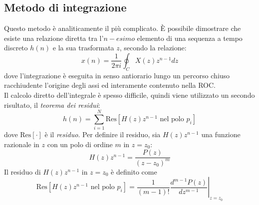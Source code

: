 \subsection{Metodo di integrazione}
Questo metodo \`e analiticamente il pi\`u complicato. \`E possibile dimostrare che esiste una relazione diretta tra l'$n-esimo$ elemento di una sequenza a tempo discreto ${h(n)}$ e la sua trasformata $z$, secondo la relazione:
\begin{displaymath}
x(n)=\frac{1}{2\pi i}\oint_C X(z)z^{n-1}dz
\end{displaymath}
dove l'integrazione \`e eseguita in senso antiorario lungo un percorso chiuso racchiudente l'origine degli assi ed interamente contenuto nella ROC.\\
Il calcolo diretto dell'integrale \`e spesso difficile, quindi viene utilizzato un secondo risultato, il \emph{teorema dei residui}:
\begin{displaymath}
h(n)=\sum_{i=1}^{N} \textrm{Res}[H(z)z^{n-1} \textrm{ nel polo }p_i]
\end{displaymath}
dove $\textrm{Res}[\cdot]$ \`e il \emph{residuo}.
Per definire il residuo, sia $H(z)z^{n-1}$ una funzione razionale in $z$ con un polo di ordine $m$ in $z=z_0$:
\begin{displaymath}
H(z)z^{n-1}=\frac{P(z)}{(z-z_0)^m}
\end{displaymath}
Il residuo di $H(z)z^{n-1}$ in $z=z_0$ \`e definito come
\begin{displaymath}
\textrm{Res}[H(z)z^{n-1} \textrm{ nel polo }p_i]=\left. \frac{1}{(m-1)!}\frac{d^{m-1}P(z)}{dz^{m-1}}\right |_{z=z_0}
\end{displaymath}
